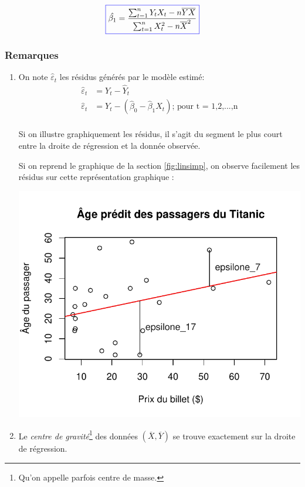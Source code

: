 \documentclass[11pt,french]{report}
\begin{document}
\begin{equation}
\label{eq:beta1}
\color{blue}
\boxed{\color{black}
\hat{\beta_1} = \frac{\sum_{t=1}^n Y_t X_t - n\overline{Y}\overline{X}}{\sum_{t=1}^n X_t^2 - n\overline{X}^2}
}
\end{equation}

\subsubsection*{Remarques}

\begin{enumerate}
\item On note $\hat{\varepsilon}_t$ les résidus générés par le modèle estimé:
\begin{align*}
\hat{\varepsilon}_t &= Y_t - \hat{Y}_t \\
\hat{\varepsilon}_t &= Y_t - (\hat{\beta}_0 - \hat{\beta}_1 X_t) \text{; pour t = 1,2,...,n} \\
\end{align*}

Si on illustre graphiquement les résidus, il s'agit du segment le plus court entre la droite de régression et la donnée observée. 

\bigskip
Si on reprend le graphique de la section \ref{fig:linsimp}, on observe facilement les résidus sur cette représentation graphique :

\includegraphics{notes_de_cours-007}

\item Le \emph{centre de gravité}\footnote{Qu'on appelle parfois centre de masse.} des données $(\overline{X}, \overline{Y})$ se trouve exactement sur la droite de régression.


\end{enumerate}
\end{document}
